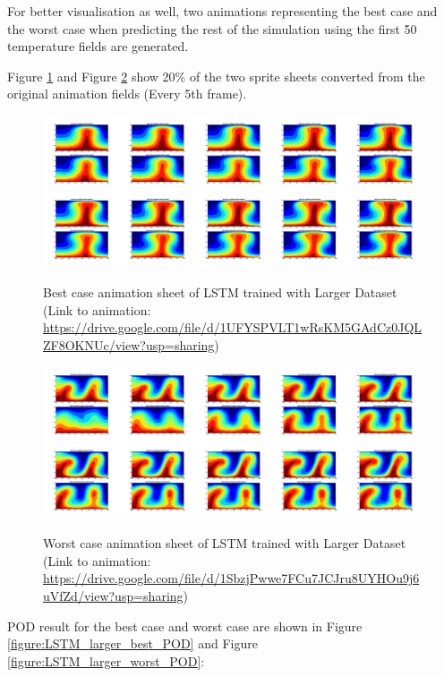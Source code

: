 For better visualisation as well, two animations representing the best case and the worst case when predicting the rest of the simulation using the first 50 temperature fields are generated.

Figure \ref{figure:LSTM_larger_best_gif} and Figure \ref{figure:LSTM_larger_worst_gif} show 20\% of the two sprite sheets converted from the original animation fields (Every 5th frame).

\begin{figure}[H]
    \centering
    \caption{Best case animation sheet of LSTM trained with Larger Dataset (Link to animation: \url{https://drive.google.com/file/d/1UFYSPVLT1wRsKM5GAdCz0JQLZF8OKNUc/view?usp=sharing})}
    \includegraphics[scale=0.10]{figures/mantle_convection_images/larger_dataset/LSTM_Best_GIF_sheet.png}
    \label{figure:LSTM_larger_best_gif}
\end{figure}



\begin{figure}[H]
    \centering
    \caption{Worst case animation sheet of LSTM trained with Larger Dataset (Link to animation: 
    \url{https://drive.google.com/file/d/1SbzjPwwe7FCu7JCJru8UYHOu9j6uVfZd/view?usp=sharing})}
    \includegraphics[scale=0.10]{figures/mantle_convection_images/larger_dataset/LSTM_Worst_GIF_sheet.png}
    \label{figure:LSTM_larger_worst_gif}
\end{figure}

POD result for the best case and worst case are shown in Figure \ref{figure:LSTM_larger_best_POD} and Figure \ref{figure:LSTM_larger_worst_POD}:

